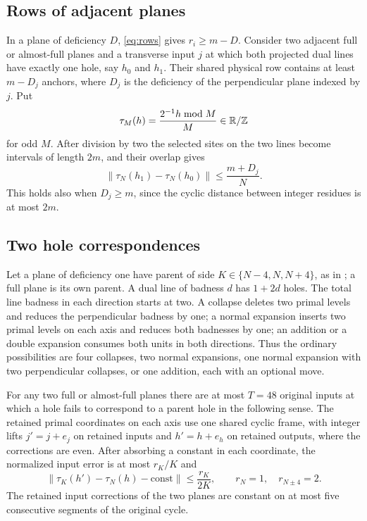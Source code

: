 \documentclass[11pt,colorlinks]{charlie}
\newcommand{\norm}[1]{\lVert #1\rVert}
\begin{document}
\subsection{Rows of adjacent planes}
In a plane of deficiency $D$, \eqref{eq:rows} gives $r_i\ge m-D$. Consider two adjacent full or almost-full planes and a transverse input $j$ at which both projected dual lines have exactly one hole, say $h_0$ and $h_1$. Their shared physical row contains at least $m-D_j$ anchors, where $D_j$ is the deficiency of the perpendicular plane indexed by $j$. Put
\[
 \tau_M(h)=\frac{2^{-1}h\bmod M}{M}\in\mathbb{R}/\mathbb{Z}
\]
for odd $M$. After division by two the selected sites on the two lines become intervals of length $2m$, and their overlap gives
\begin{equation}\label{eq:cutoff-row}
 \norm{\tau_N(h_1)-\tau_N(h_0)}\le\frac{m+D_j}{N}.
\end{equation}
This holds also when $D_j\ge m$, since the cyclic distance between integer residues is at most $2m$.

\subsection{Two hole correspondences}
Let a plane of deficiency one have parent of side $K\in\{N-4,N,N+4\}$, as in ; a full plane is its own parent. A dual line of badness $d$ has $1+2d$ holes. The total line badness in each direction starts at two. A collapse deletes two primal levels and reduces the perpendicular badness by one; a normal expansion inserts two primal levels on each axis and reduces both badnesses by one; an addition or a double expansion consumes both units in both directions. Thus the ordinary possibilities are four collapses, two normal expansions, one normal expansion with two perpendicular collapses, or one addition, each with an optional move.

\begin{lemma}\label{lem:first-corr}
For any two full or almost-full planes there are at most $T=48$ original inputs at which a hole fails to correspond to a parent hole in the following sense. The retained primal coordinates on each axis use one shared cyclic frame, with integer lifts $j'=j+e_j$ on retained inputs and $h'=h+e_h$ on retained outputs, where the corrections are even. After absorbing a constant in each coordinate, the normalized input error is at most $r_K/K$ and
\[
 \norm{\tau_K(h')-\tau_N(h)-\mathrm{const}}\le\frac{r_K}{2K},\qquad r_N=1,\quad r_{N\pm4}=2 .
\]
The retained input corrections of the two planes are constant on at most five consecutive segments of the original cycle.
\end{lemma}
\end{document}
